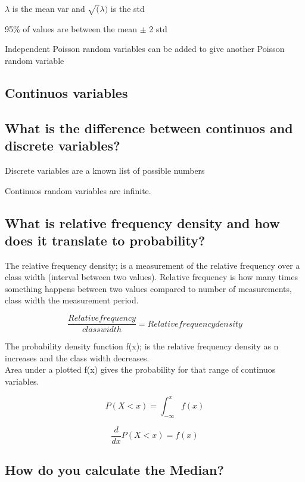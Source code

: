 \documentclass[11pt]{scrartcl} %
\begin{document}
\(\lambda\) is the mean var and \(\sqrt(\lambda)\) is the std

95\% of values are between the mean \(\pm\) 2 std

Independent Poisson random variables can be added to give another
Poisson random variable

\subsection{Continuos variables}

\subsection{What is the difference between continuos and discrete
variables?}

Discrete variables are a known list of possible numbers

Continuos random variables are infinite.

\subsection{What is relative frequency density and how does it
translate to
probability?}

The relative frequency density; is a measurement of the relative
frequency over a class width (interval between two values). Relative frequency is how many times 
something happens between two values compared to number of measurements, 
class width the measurement period.

\begin{equation}
	\frac{Relative frequency}{class width} = Relative frequency density
\end{equation}

The probability density function f(x); is the relative frequency density
as n increases and the class width decreases.\\

Area under a plotted f(x) gives the probability for that range of
continuos variables.

\begin{equation}
	P(X<x) = \int_{-\infty}^{x} f(x)
\end{equation}

\begin{equation}
	\frac{d}{dx}P(X<x) = f(x)
\end{equation}

\subsection{How do you calculate the
Median?}
\end{document}
